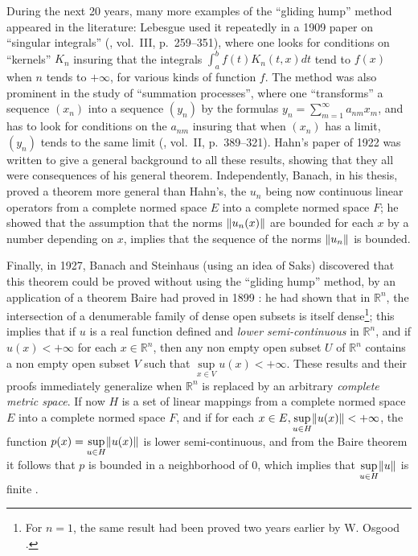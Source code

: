\documentclass[12pt,a4paper,leqno,twoside]{extbook}
\DeclarePairedDelimiter{\norm}{\lVert}{\rVert}
\newcommand{\R}{\mathbb{R}}
\begin{document}
During the next 20 years, many more examples of the ``gliding hump'' method appeared in the literature: Lebesgue used it repeatedly in a 1909 paper on ``singular integrals'' (\cite{138}, vol.~III, p.~259--351), where one looks for conditions on ``kernels'' \(K_n\) insuring that the integrals \(\int_a^b f(t)K_n(t,x)dt\) tend to \(f(x)\) when \(n\) tends to \(+\infty\), for various kinds of function \(f\). The method was also prominent in the study of ``summation processes'', where one ``transforms'' a sequence \((x_n)\) into a sequence \((y_n)\) by the formulas \(y_n = \sum\limits_{m=1}^\infty a_{nm} x_m\), and has to look for conditions on the \(a_{nm}\) insuring that when \((x_n)\) has a limit, \((y_n)\) tends to the same limit (\cite{193}, vol.~II, p.~389--321). Hahn's paper of 1922 \cite{097} was written to give a general background to all these results, showing that they all were consequences of his general theorem. Independently, Banach, in his thesis, proved a theorem more general than Hahn's, the \(u_n\) being now continuous linear operators from a complete normed space \(E\) into a complete normed space \(F\); he showed that the assumption that the norms \(\norm{u_n(x)}\) are bounded for each \(x\) by a number depending on \(x\), implies that the sequence of the norms \(\norm{u_n}\) is bounded.

Finally, in 1927, Banach and Steinhaus (using an idea of Saks) discovered that this theorem could be proved without using the ``gliding hump'' method, by an application of a theorem Baire had proved in 1899 \cite{011}: he had shown that in \(\R^n\), the intersection of a denumerable family of dense open subsets is itself dense\footnote{For \(n =1\), the same result had been proved two years earlier by W. Osgood \cite{170}.}; this implies that if \(u\) is a real function defined and \emph{lower semi-continuous} in \(\R^n\), and if \(u(x) < +\infty\) for each \(x \in \R^n\), then any non empty open subset \(U\) of \(\R^n\) contains a non empty open subset \(V\) such that \(\sup\limits_{x \in V} u(x) < +\infty\). These results and their proofs immediately generalize when \(\R^n\) is replaced by an arbitrary \emph{complete metric space}. If now \(H\) is a set of linear mappings from a complete normed space \(E\) into a complete normed space \(F\), and if for each \(x \in E, \sup\limits_{u \in H} \norm{u(x)} < +\infty\), the function \(p(x) = \sup\limits_{u \in H} \norm{u(x)}\) is lower semi-continuous, and from the Baire theorem it follows that \(p\) is bounded in a neighborhood of 0, which implies that \(\sup\limits_{u \in H} \norm{u}\) is finite \cite{016}.
\end{document}
